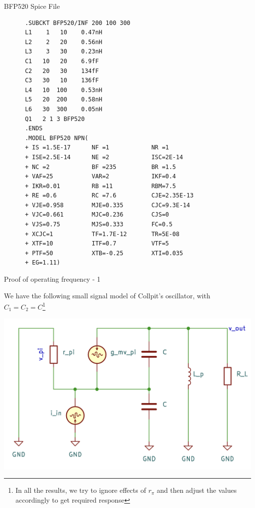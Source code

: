 \documentclass{beamer}
\begin{document}
\begin{frame}[fragile]{BFP520 Spice File}
  \begin{tiny}
    \begin{lstlisting}
      .SUBCKT BFP520/INF 200 100 300
      L1    1   10    0.47nH
      L2    2   20    0.56nH
      L3    3   30    0.23nH
      C1   10   20    6.9fF
      C2   20   30    134fF
      C3   30   10    136fF
      L4   10  100    0.53nH
      L5   20  200    0.58nH
      L6   30  300    0.05nH
      Q1   2 1 3 BFP520
      .ENDS
      .MODEL BFP520 NPN(
      + IS =1.5E-17      NF =1            NR =1
      + ISE=2.5E-14      NE =2            ISC=2E-14
      + NC =2            BF =235          BR =1.5
      + VAF=25           VAR=2            IKF=0.4
      + IKR=0.01         RB =11           RBM=7.5
      + RE =0.6          RC =7.6          CJE=2.35E-13
      + VJE=0.958        MJE=0.335        CJC=9.3E-14
      + VJC=0.661        MJC=0.236        CJS=0
      + VJS=0.75         MJS=0.333        FC=0.5
      + XCJC=1           TF=1.7E-12       TR=5E-08
      + XTF=10           ITF=0.7          VTF=5
      + PTF=50           XTB=-0.25        XTI=0.035
      + EG=1.11)
    \end{lstlisting}
  \end{tiny}
  
  \end{frame}

  \begin{frame}{Proof of operating frequency - 1}

  We have the following small signal model of Collpit's oscillator, with \(C_1 = C_2 = C\)\footnote{In all the results, we try to ignore effects of \(r_\pi\) and then adjust the values accordingly to get required response}
  \begin{center}
    \includegraphics[width = 0.7\linewidth]{images/ssm.png}
  \end{center}
  
\end{frame}
\end{document}
